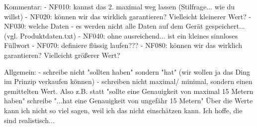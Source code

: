 
Kommentar:
- NF010: kannst das 2. maximal weg lassen (Stilfrage... wie du willst)
- NF020: können wir das wirklich garantieren? Vielleicht kleinerer Wert?
- NF030: welche Daten - es werden nicht alle Daten auf dem Gerät gespeichert... (vgl. Produktdaten.txt)
- NF040: ohne ausreichend... ist ein kleines sinnloses Füllwort
- NF070: definiere flüssig laufen??? 
- NF080: können wir das wirklich garantieren? Vielleicht größerer Wert?

Allgemein:
- schreibe nicht "sollten haben" sondern "hat" (wir wollen ja das Ding im Prinzip verkaufen können)
- schreiben nicht maximal/ minimal, sondern einen gemittelten Wert.
Also z.B. statt "sollte eine Genauigkeit von maximal 15 Metern haben" schreibe "...hat eine Genauigkeit von ungefähr 15 Metern"
Über die Werte kann ich nicht so viel sagen, weil ich das nicht einschätzen kann. Ich hoffe, die sind realistisch...